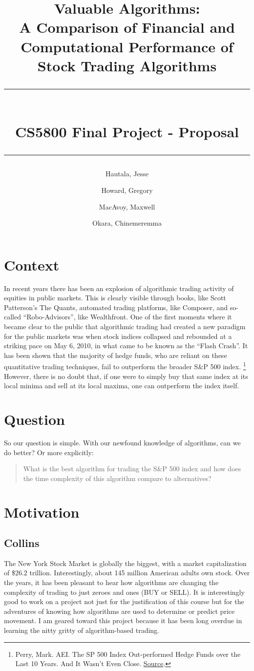 \documentclass[12pt,english]{article}
\title{
    \textbf{Valuable Algorithms:}\\
    A Comparison of Financial and Computational Performance of Stock Trading Algorithms\\
    \rule[3mm]{\textwidth}{1pt}\\
    \large CS5800 Final Project - Proposal\\
    \rule{\textwidth}{1pt}
}
\author{Hautala, Jesse \and Howard, Gregory \and MacAvoy, Maxwell \and Okara, Chinemeremma}
\begin{document}
\maketitle

\section*{Context}
In recent years there has been an explosion of algorithmic trading activity of equities in public markets. This is clearly visible through books, like Scott Patterson’s The Quants, automated trading platforms, like Composer, and so-called “Robo-Advisors”, like Wealthfront. One of the first moments where it became clear to the public that algorithmic trading had created a new paradigm for the public markets was when stock indices collapsed and rebounded at a striking pace on May 6, 2010, in what came to be known as the “Flash Crash”.
\newline\newline
\noindent It has been shown that the majority of hedge funds, who are reliant on these quantitative trading techniques, fail to outperform the broader S\&P 500 index.
\footnote{Perry, Mark. AEI. The SP 500 Index Out-performed Hedge Funds over the Last 10 Years. And It Wasn’t Even Close. \href{https://www.aei.org/carpe-diem/the-sp-500-index-out-performed-hedge-funds-over-the-last-10-years-and-it-wasnt-even-close/}{Source}.}
However, there is no doubt that, if one were to simply buy that same index at its local minima and sell at its local maxima, one can outperform the index itself.
\newpage
\section*{Question}
So our question is simple. With our newfound knowledge of algorithms, can we do better? Or more explicitly:
\begin{quote}
What is the best algorithm for trading the S\&P 500 index and how does the time complexity of this algorithm compare to alternatives?
\end{quote}

\section*{Motivation}
\subsection*{Collins}
The New York Stock Market is globally the biggest, with a market capitalization of \$26.2 trillion. Interestingly, about 145 million American adults own stock. Over the years, it has been pleasant to hear how algorithms are changing the complexity of trading to just zeroes and ones (BUY or SELL). It is interestingly good to work on a project not just for the justification of this course but for the adventures of knowing how algorithms are used to determine or predict price movement. I am geared toward this project because it has been long overdue in learning the nitty gritty of algorithm-based trading.
\end{document}
